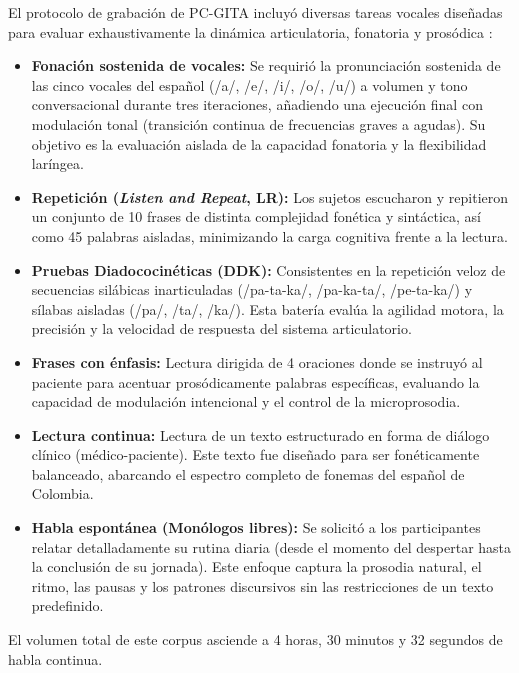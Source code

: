             El protocolo de grabación de PC-GITA incluyó diversas tareas vocales diseñadas para evaluar exhaustivamente la dinámica articulatoria, fonatoria y prosódica \cite{orozco2014}:

            \begin{itemize}
                \item \textbf{Fonación sostenida de vocales:} Se requirió la pronunciación sostenida de las cinco vocales del español (/a/, /e/, /i/, /o/, /u/) a volumen y tono conversacional durante tres iteraciones, añadiendo una ejecución final con modulación tonal (transición continua de frecuencias graves a agudas). Su objetivo es la evaluación aislada de la capacidad fonatoria y la flexibilidad laríngea.
                
                \item \textbf{Repetición (\textit{Listen and Repeat}, LR):} Los sujetos escucharon y repitieron un conjunto de 10 frases de distinta complejidad fonética y sintáctica, así como 45 palabras aisladas, minimizando la carga cognitiva frente a la lectura.
                
                \item \textbf{Pruebas Diadococinéticas (DDK):} Consistentes en la repetición veloz de secuencias silábicas inarticuladas (/pa-ta-ka/, /pa-ka-ta/, /pe-ta-ka/) y sílabas aisladas (/pa/, /ta/, /ka/). Esta batería evalúa la agilidad motora, la precisión y la velocidad de respuesta del sistema articulatorio.
                
                \item \textbf{Frases con énfasis:} Lectura dirigida de 4 oraciones donde se instruyó al paciente para acentuar prosódicamente palabras específicas, evaluando la capacidad de modulación intencional y el control de la microprosodia.
                
                \item \textbf{Lectura continua:} Lectura de un texto estructurado en forma de diálogo clínico (médico-paciente). Este texto fue diseñado para ser fonéticamente balanceado, abarcando el espectro completo de fonemas del español de Colombia.
                
                \item \textbf{Habla espontánea (Monólogos libres):} Se solicitó a los participantes relatar detalladamente su rutina diaria (desde el momento del despertar hasta la conclusión de su jornada). Este enfoque captura la prosodia natural, el ritmo, las pausas y los patrones discursivos sin las restricciones de un texto predefinido.
            \end{itemize}

            El volumen total de este corpus asciende a 4 horas, 30 minutos y 32 segundos de habla continua.     

    